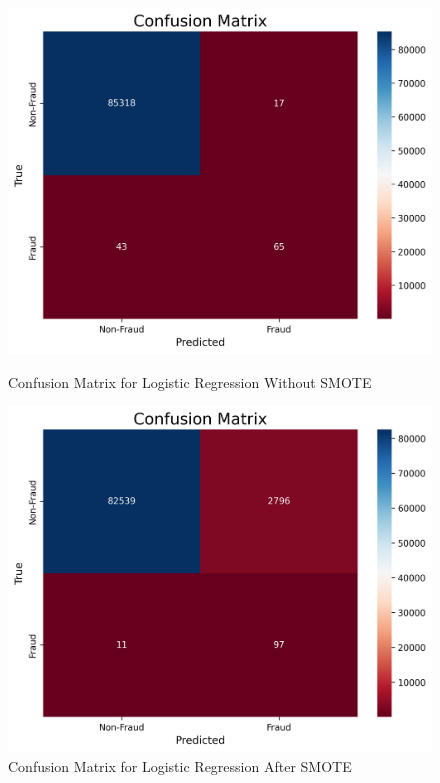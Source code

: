 \documentclass[11pt, oneside]{article}   	%
\begin{document}
\begin{figure}[H]
    \centering
    \begin{minipage}{0.49\textwidth}
        \centering
        \includegraphics[width=1.0\textwidth]{images/confusion_matrix_logit_without_smote.png}
        \caption{Confusion Matrix for Logistic Regression Without SMOTE}
        \label{fig:confusion_matrix_lr_without_smote}
    \end{minipage}\hfill
    \begin{minipage}{0.49\textwidth}
        \centering
        \includegraphics[width=1.0\textwidth]{images/confusion_matrix_logit.png}
        \caption{Confusion Matrix for Logistic Regression After SMOTE}
        \label{fig:confusion_matrix_lr_with_smote}
    \end{minipage}
\end{figure}
\end{document}

